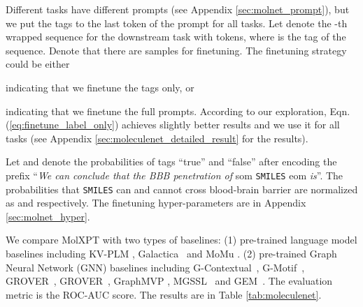 \documentclass[11pt]{article}
\newcommand{\ourM}{MolXPT}
\newcommand{\som}{som}
\newcommand{\eom}{eom}
\begin{document}
Different tasks have different prompts (see Appendix \ref{sec:molnet_prompt}), but we put the tags to the last token of the prompt for all tasks. Let  denote the -th wrapped sequence for the downstream task with  tokens, where  is the tag of the sequence. Denote that there are  samples for finetuning. The finetuning strategy could be either 

indicating that we finetune  the tags only, or

indicating that we finetune the full prompts. According to our exploration, Eqn.(\ref{eq:finetune_label_only}) achieves slightly better results and we use it for all tasks (see Appendix \ref{sec:moleculenet_detailed_result} for the results).

Let   and  denote the probabilities of tags ``true'' and ``false'' after encoding the prefix ``{\em We can conclude that the BBB penetration of }\som{} \texttt{SMILES} \eom{} {\em is}''. 
The probabilities that \texttt{SMILES} can and cannot cross blood-brain barrier are normalized as  and  respectively. The finetuning hyper-parameters are  in Appendix \ref{sec:molnet_hyper}. 

We compare \ourM{} with two types of baselines: (1) pre-trained language model baselines including KV-PLM \cite{Zeng2022KV-PLM}, Galactica~\citep{taylor2022galactica} and MoMu \citep{su2022molecular}. (2) pre-trained Graph Neural Network (GNN) baselines including G-Contextual~\citep{rong2020self}, G-Motif~\citep{rong2020self}, GROVER~\citep{rong2020self}, GROVER~\citep{rong2020self}, GraphMVP \citep{graph_mvp}, MGSSL~\citep{zhang2021motif} and GEM~\citep{fang2022geometry}. The evaluation metric is the ROC-AUC score. The results are in Table \ref{tab:moleculenet}.
\end{document}
